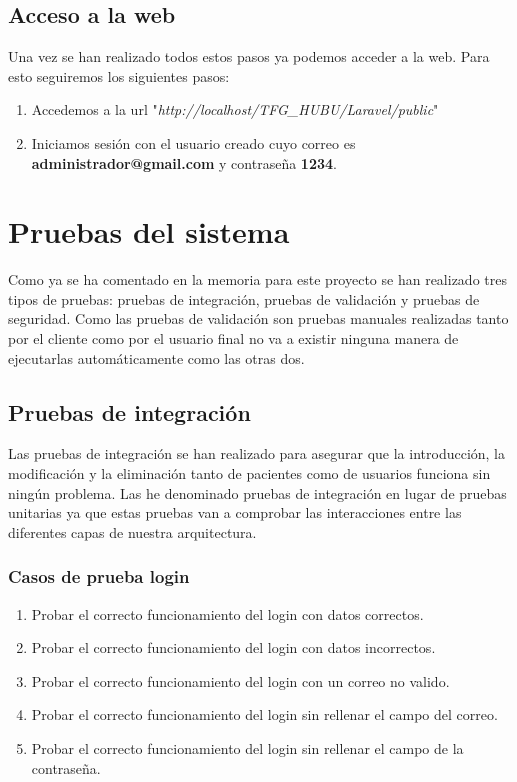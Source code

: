 \subsection{Acceso a la web}

Una vez se han realizado todos estos pasos ya podemos acceder a la web. Para esto seguiremos los siguientes pasos:

\begin{enumerate}
    \item Accedemos a la url "\textit{http://localhost/TFG\_HUBU/Laravel/public}"
    \item Iniciamos sesión con el usuario creado cuyo correo es \textbf{administrador@gmail.com} y contraseña \textbf{1234}.
\end{enumerate}

\section{Pruebas del sistema}

Como ya se ha comentado en la memoria para este proyecto se han realizado tres tipos de pruebas: pruebas de integración, pruebas de validación y pruebas de seguridad. Como las pruebas de validación son pruebas manuales realizadas tanto por el cliente como por el usuario final no va a existir ninguna manera de ejecutarlas automáticamente como las otras dos.

\subsection{Pruebas de integración}

Las pruebas de integración se han realizado para asegurar que la introducción, la modificación y la eliminación tanto de pacientes como de usuarios funciona sin ningún problema. Las he denominado pruebas de integración en lugar de pruebas unitarias ya que estas pruebas van a comprobar las interacciones entre las diferentes capas de nuestra arquitectura.

\subsubsection{Casos de prueba login}

\begin{enumerate}
    \item Probar el correcto funcionamiento del login con datos correctos.
    \item Probar el correcto funcionamiento del login con datos incorrectos.
    \item Probar el correcto funcionamiento del login con un correo no valido.
    \item Probar el correcto funcionamiento del login sin rellenar el campo del correo.
    \item Probar el correcto funcionamiento del login sin rellenar el campo de la contraseña.
\end{enumerate}

